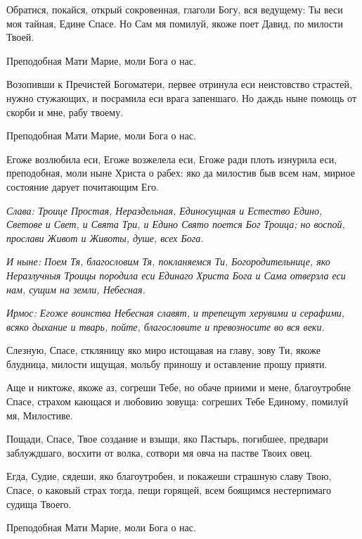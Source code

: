 Обратися, покайся, открый сокровенная, глаголи Богу, вся ведущему: Ты веси моя тайная, Едине Спасе. Но Сам мя помилуй, якоже поет Давид, по милости Твоей. 

\bfseries 

Преподобная Мати Марие, моли Бога о нас.

\normalfont{}

Возопивши к Пречистей Богоматери, первее отринула еси неистовство страстей, нужно стужающих, и посрамила еси врага запеншаго. Но даждь ныне помощь от скорби и мне, рабу твоему. 

\bfseries 

Преподобная Мати Марие, моли Бога о нас.

\normalfont{}

Егоже возлюбила еси, Егоже возжелела еси, Егоже ради плоть изнурила еси, преподобная, моли ныне Христа о рабех: яко да милостив быв всем нам, мирное состояние дарует почитающим Его. 

\itshape Слава\normalfont{}: Троице Простая, Нераздельная, Единосущная и Естество Едино, Светове и Свет, и Свята Три, и Едино Свято поется Бог Троица; но воспой, прослави Живот и Животы, душе, всех Бога. 

\itshape И ныне\normalfont{}: Поем Тя, благословим Тя, покланяемся Ти, Богородительнице, яко Неразлучныя Троицы породила еси Единаго Христа Бога и Сама отверзла еси нам, сущим на земли, Небесная.



\itshape Ирмос\normalfont{}: Егоже воинства Небесная славят, и трепещут херувими и серафими, всяко дыхание и тварь, пойте, благословите и превозносите во вся веки. 

Слезную, Спасе, сткляницу яко миро истощавая на главу, зову Ти, якоже блудница, милости ищущая, мольбу приношу и оставление прошу прияти. 

Аще и никтоже, якоже аз, согреши Тебе, но обаче приими и мене, благоутробне Спасе, страхом кающася и любовию зовуща: согреших Тебе Единому, помилуй мя, Милостиве. 

Пощади, Спасе, Твое создание и взыщи, яко Пастырь, погибшее, предвари заблуждшаго, восхити от волка, сотвори мя овча на пастве Твоих овец. 

Егда, Судие, сядеши, яко благоутробен, и покажеши страшную славу Твою, Спасе, о каковый страх тогда, пещи горящей, всем боящимся нестерпимаго судища Твоего. 

\bfseries 

Преподобная Мати Марие, моли Бога о нас.

